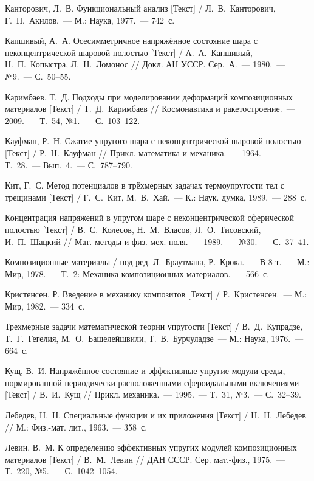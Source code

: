 \begin{biblist}{99}
Канторович, Л.~В. 
Функциональный анализ [Текст] / Л.~В.~Канторович, Г.~П.~Акилов.~--- М.: Наука, 1977.~--- 742~с.

Капшивый, А.~А. 
Осесимметричное напряжённое состояние шара с неконцентрической шаровой полостью [Текст] 
/ А.~А.~Капшивый, Н.~П.~Копыстра, Л.~Н.~Ломонос 
// Докл. АН УССР. Сер.~А.~--- 1980.~--- №9.~--- С.~50--55.

Каримбаев, Т.~Д. 
Подходы при моделировании деформаций композиционных материалов [Текст] / Т.~Д.~Каримбаев 
// Космонавтика и ракетостроение.~--- 2009.~--- Т.~54, №1.~--- С.~103--122.

Кауфман, Р.~Н. 
Сжатие упругого шара с неконцентрической шаровой полостью [Текст] 
/ Р.~Н.~Кауфман 
// Прикл. математика и механика.~--- 1964.~--- Т.~28.~--- Вып.~4.~--- С.~787--790.

Кит, Г.~С. 
Метод потенциалов в трёхмерных задачах термоупругости тел с трещинами [Текст] 
/ Г.~С.~Кит, М.~В.~Хай.~--- К.: Наук. думка, 1989.~--- 288~с.

Концентрация напряжений в упругом шаре с неконцентрической сферической полостью [Текст] 
/ В.~С.~Колесов, Н.~М.~Власов, Л.~О.~Тисовский, И.~П.~Шацкий 
// Мат. методы и физ.-мех. поля.~--- 1989.~--- №30.~--- С.~37--41.

Композиционные материалы 
/ под ред. Л.~Браутмана, Р.~Крока.~--- В 8 т.~--- М.: Мир, 1978.~--- Т.~2: Механика композиционных материалов.~--- 566~с.

Кристенсен, Р. 
Введение в механику композитов [Текст] 
/ Р.~Кристенсен.~--- М.: Мир, 1982.~--- 334~с.

Трехмерные задачи математической теории упругости [Текст] 
/ В.~Д.~Купрадзе, Т.~Г.~Гегелия, М.~О.~Башелейшвили, Т.~В.~Бурчуладзе~--- М.: Наука, 1976.~--- 664~с.

Кущ, В.~И. 
Напряжённое состояние и эффективные упругие модули среды, нормированной периодически расположенными сфероидальными включениями [Текст] 
/ В.~И.~Кущ 
// Прикл. механика.~--- 1995.~--- Т.~31, №3.~--- С.~32--39.

Лебедев, Н.~Н. 
Специальные функции и их приложения [Текст] 
/ Н.~Н.~Лебедев
// М.: Физ.-мат. лит., 1963.~--- 358~с.

Левин, В.~М. 
К определению эффективных упругих модулей композиционных материалов [Текст] 
/ В.~М.~Левин 
// ДАН СССР. Сер. мат.-физ., 1975.~--- Т.~220, №5.~--- С.~1042--1054.


\end{biblist}
